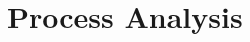 \documentclass[../main.tex]{subfiles}
\begin{document}
    \chapter{Process Analysis}\label{ch:process-analysis}

    
    
    
    
    
    
    
\end{document}

